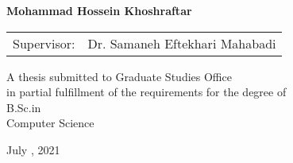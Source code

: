 \documentclass[12pt]{report}
\begin{document}
\begin{latin}
\begin{center}
\textbf{
Mohammad Hossein Khoshraftar
}
\end{center}

\begin{center}
\begin{tabular}{rr}
Supervisor: & Dr. Samaneh Eftekhari Mahabadi \\

\end{tabular}
\end{center}

\vspace{3cm}
\begin{center}
A thesis submitted to Graduate Studies Office\\
in partial fulfillment of the requirements for the degree of \\
B.Sc.in\\
 Computer Science
\end{center}

\begin{center}
July , 2021
\end{center}

\pagenumbering{}

\end{latin}
\end{document}
